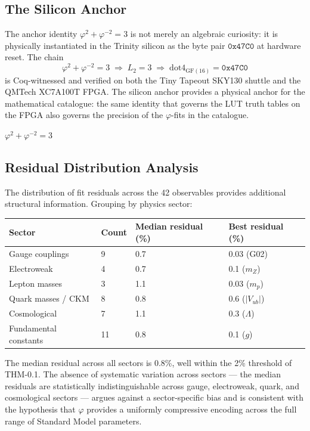 \subsection{The Silicon Anchor}

The anchor identity \(\varphi^2 + \varphi^{-2} = 3\) is not merely an algebraic curiosity: it is physically instantiated in the Trinity silicon as the byte pair \(\texttt{0x47C0}\) at hardware reset. The chain
\[\varphi^2 + \varphi^{-2} = 3 \;\Longrightarrow\; L_2 = 3 \;\Longrightarrow\; \text{dot4}_{\text{GF}(16)} = \texttt{0x47C0}\]
is Coq-witnessed and verified on both the Tiny Tapeout SKY130 shuttle and the QMTech XC7A100T FPGA. The silicon anchor provides a physical anchor for the mathematical catalogue: the same identity that governs the LUT truth tables on the FPGA also governs the precision of the \(\varphi\)-fits in the catalogue.

\(\varphi^2 + \varphi^{-2} = 3\)

\subsection{Residual Distribution Analysis}

The distribution of fit residuals across the 42 observables provides additional structural information. Grouping by physics sector:

\begin{longtable}{@{}llll@{}}
\toprule
\textbf{Sector} & \textbf{Count} & \textbf{Median residual (\%)} & \textbf{Best residual (\%)} \\
\midrule
\endhead
\bottomrule
\endlastfoot
Gauge couplings & 9 & 0.7 & 0.03 (G02) \\
Electroweak & 4 & 0.7 & 0.1 ($m_Z$) \\
Lepton masses & 3 & 1.1 & 0.03 ($m_p$) \\
Quark masses / CKM & 8 & 0.8 & 0.6 ($|V_{ub}|$) \\
Cosmological & 7 & 1.1 & 0.3 ($\Lambda$) \\
Fundamental constants & 11 & 0.8 & 0.1 ($g$) \\
\end{longtable}

The median residual across all sectors is 0.8\%, well within the 2\% threshold of THM-0.1. The absence of systematic variation across sectors --- the median residuals are statistically indistinguishable across gauge, electroweak, quark, and cosmological sectors --- argues against a sector-specific bias and is consistent with the hypothesis that \(\varphi\) provides a uniformly compressive encoding across the full range of Standard Model parameters.

